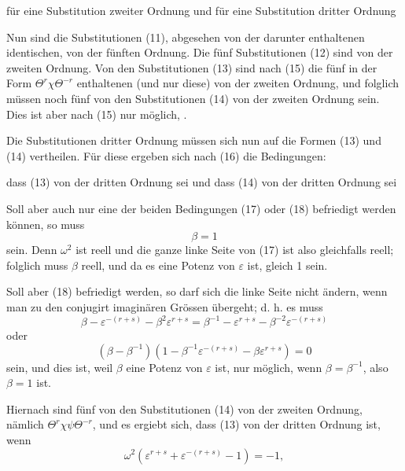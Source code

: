 
für eine Substitution zweiter Ordnung
und für eine Substitution dritter Ordnung

Nun sind die Substitutionen (11), abgesehen von der darunter enthaltenen identischen, von der fünften Ordnung. Die fünf Substitutionen (12) sind von der zweiten Ordnung. Von den Substitutionen (13) sind nach (15) die fünf in der Form $\Theta^r\chi\Theta^{-r}$ enthaltenen (und nur diese) von der zweiten Ordnung, und folglich müssen noch fünf von den Substitutionen (14) von der zweiten Ordnung sein. Dies ist aber nach (15) nur möglich, .

Die Substitutionen dritter Ordnung müssen sich nun auf die Formen (13) und (14) vertheilen. Für diese ergeben sich nach (16) die Bedingungen:

dass (13) von der dritten Ordnung sei
und dass (14) von der dritten Ordnung sei

Soll aber auch nur eine der beiden Bedingungen (17) oder (18) befriedigt werden können, so muss
\[
\beta = 1
\]
sein. Denn $\omega^2$ ist reell und die ganze linke Seite von (17) ist also gleichfalls reell; folglich muss $\beta$ reell, und da es eine Potenz von $\varepsilon$ ist, gleich 1 sein.

Soll aber (18) befriedigt werden, so darf sich die linke Seite nicht ändern, wenn man zu den conjugirt imaginären Grössen übergeht; d. h. es muss
\[
\beta - \varepsilon^{-(r+s)} - \beta^2\varepsilon^{r+s} = \beta^{-1} - \varepsilon^{r+s} - \beta^{-2}\varepsilon^{-(r+s)}
\]
oder
\[
(\beta - \beta^{-1})(1 - \beta^{-1}\varepsilon^{-(r+s)} - \beta\varepsilon^{r+s}) = 0
\]
sein, und dies ist, weil $\beta$ eine Potenz von $\varepsilon$ ist, nur möglich, wenn $\beta = \beta^{-1}$, also $\beta = 1$ ist.

Hiernach sind fünf von den Substitutionen (14) von der zweiten Ordnung, nämlich $\Theta^r\chi\psi\Theta^{-r}$, und es ergiebt sich, dass (13) von der dritten Ordnung ist, wenn
\[
\omega^2(\varepsilon^{r+s} + \varepsilon^{-(r+s)} - 1) = -1,
\]

